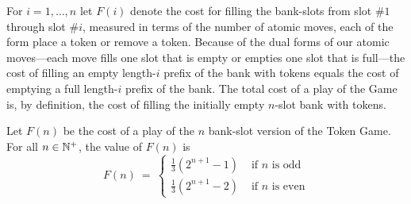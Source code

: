 For $i = 1, \ldots, n$ let $F(i)$ denote the cost for filling the
bank-slots from slot \#$1$ through slot \#$i$, measured in terms of
the number of atomic moves, each of the form {\sc place a token} or
{\sc remove a token}.  Because of the dual forms of our atomic
moves---each move fills one slot that is empty or empties one slot
that is full---the cost of filling an empty length-$i$ prefix of the
bank with tokens equals the cost of emptying a full length-$i$ prefix
of the bank.  The total cost of a play of the Game is, by definition,
the cost of filling the initially empty $n$-slot bank with tokens.

\begin{prop}
\label{thm:f-cost of TokenGame}
Let $F(n)$ be the cost of a play of the $n$ bank-slot version of the
Token Game.  For all $n \in \mathbb{N}^+$, the value of $F(n)$ is
\begin{equation}
\label{eq:f-cost:Token-Game}
F(n) \ = \ \left\{
\begin{array}{ll}
 \frac{1}{3} \left( 2^{n+1} -1 \right)
  & \mbox{  if $n$ is odd} \\
 \frac{1}{3} \left( 2^{n+1} -2 \right)
  & \mbox{  if $n$ is even}
\end{array}
\right.
\end{equation}
\end{prop}

